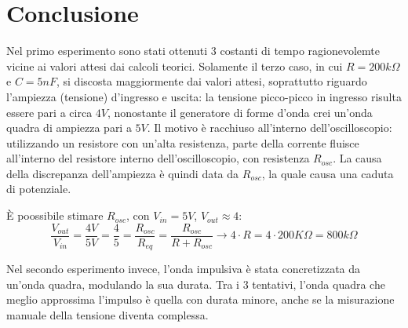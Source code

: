     \section{Conclusione}
    Nel primo esperimento sono stati ottenuti 3 costanti di tempo ragionevolemte vicine ai valori
    attesi dai calcoli teorici. Solamente il terzo caso, in cui $R = 200k\Omega$ e $C = 5nF$, si discosta maggiormente
    dai valori attesi, soprattutto riguardo l'ampiezza (tensione) d'ingresso e uscita: la tensione picco-picco
    in ingresso risulta essere pari a circa $4 V$, nonostante il generatore di forme d'onda crei un'onda quadra di ampiezza
    pari a $5V$. Il motivo è racchiuso all'interno dell'oscilloscopio: utilizzando un resistore con un'alta resistenza,
    parte della corrente fluisce all'interno del resistore interno dell'oscilloscopio, con resistenza $R_{osc}$.
    La causa della discrepanza dell'ampiezza è quindi data da $R_{osc}$, la quale causa una caduta di potenziale.\par
    È poossibile stimare $R_{osc}$, con $V_{in} = 5V$, $V_{out} \approx 4$: 
    \begin{equation}
        \frac{V_{out}}{V_{in}} = \frac{4V}{5V} = \frac{4}{5} = \frac{R_{osc}}{R_{eq}} = \frac{R_{osc}}{R + R_{osc}} \longrightarrow
        4 \cdot R = 4 \cdot 200K\Omega = 800 k\Omega
    \end{equation}
    \par
    Nel secondo esperimento invece, l'onda impulsiva è stata concretizzata da un'onda quadra, modulando la sua durata.
    Tra i 3 tentativi, l'onda quadra che meglio approssima l'impulso è quella con durata minore, anche se la misurazione manuale
    della tensione diventa complessa.
    
